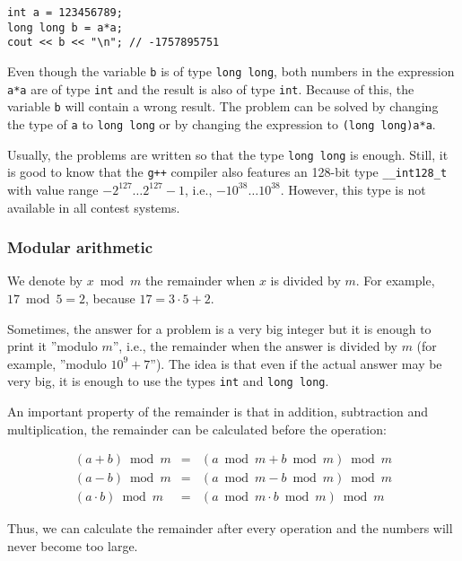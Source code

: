 \begin{lstlisting}
int a = 123456789;
long long b = a*a;
cout << b << "\n"; // -1757895751
\end{lstlisting}

Even though the variable \texttt{b} is of type \texttt{long long},
both numbers in the expression \texttt{a*a}
are of type \texttt{int} and the result is
also of type \texttt{int}.
Because of this, the variable \texttt{b} will
contain a wrong result.
The problem can be solved by changing the type
of \texttt{a} to \texttt{long long} or
by changing the expression to \texttt{(long long)a*a}.

Usually, the problems are written so that the
type \texttt{long long} is enough.
Still, it is good to know that
the \texttt{g++} compiler also features
an 128-bit type \texttt{\_\_int128\_t}
with value range
$-2^{127} \ldots 2^{127}-1$, i.e., $-10^{38} \ldots 10^{38}$.
However, this type is not available in all contest systems.

\subsubsection{Modular arithmetic}


We denote by $x \bmod m$ the remainder
when $x$ is divided by $m$.
For example, $17 \bmod 5 = 2$,
because $17 = 3 \cdot 5 + 2$.

Sometimes, the answer for a problem is a
very big integer but it is enough to
print it ''modulo $m$'', i.e.,
the remainder when the answer is divided by $m$
(for example, ''modulo $10^9+7$'').
The idea is that even if the actual answer
may be very big,
it is enough to use the types
\texttt{int} and \texttt{long long}.

An important property of the remainder is that
in addition, subtraction and multiplication,
the remainder can be calculated before the operation:

\[
\begin{array}{rcr}
(a+b) \bmod m & = & (a \bmod m + b \bmod m) \bmod m \\
(a-b) \bmod m & = & (a \bmod m - b \bmod m) \bmod m \\
(a \cdot b) \bmod m & = & (a \bmod m \cdot b \bmod m) \bmod m
\end{array}
\]

Thus, we can calculate the remainder after every operation
and the numbers will never become too large.

